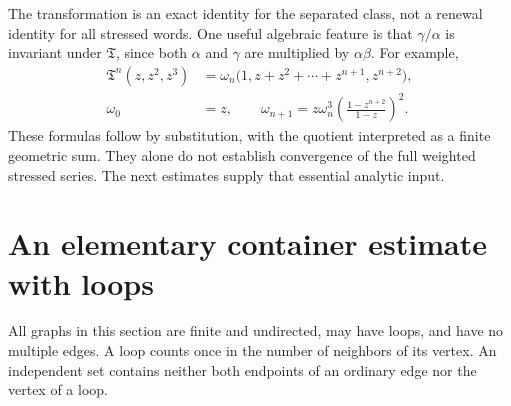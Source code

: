 \documentclass[11pt,letterpaper]{article}
\theoremstyle{definition}
\begin{document}
The transformation is an exact identity for the separated class, not a renewal identity for all stressed words. One useful algebraic feature is that $\gamma/\alpha$ is invariant under $\mathfrak T$, since both $\alpha$ and $\gamma$ are multiplied by $\alpha\beta$. For example,
\begin{align}
\mathfrak T^n(z,z^2,z^3)
&=\omega_n\bigl(1,z+z^2+\cdots+z^{n+1},z^{n+2}\bigr),\label{ska:eq:iterates}\\
\omega_0&=z,\qquad
\omega_{n+1}=z\omega_n^3\left(\frac{1-z^{n+2}}{1-z}\right)^2.\nonumber
\end{align}
These formulas follow by substitution, with the quotient interpreted as a finite geometric sum. They alone do not establish convergence of the full weighted stressed series. The next estimates supply that essential analytic input.

\section{An elementary container estimate with loops}\label{ska:sec:containers}
All graphs in this section are finite and undirected, may have loops, and have no multiple edges. A loop counts once in the number of neighbors of its vertex. An independent set contains neither both endpoints of an ordinary edge nor the vertex of a loop.
\end{document}
